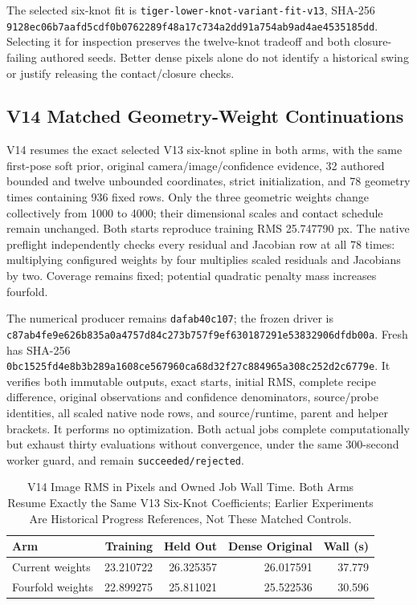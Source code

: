 \documentclass[11pt,letterpaper]{article}
\newcommand{\code}[1]{\nolinkurl{#1}}
\newcommand{\hash}[1]{{\footnotesize\nolinkurl{#1}}}
\begin{document}
The selected six-knot fit is \code{tiger-lower-knot-variant-fit-v13}, SHA-256
\hash{9128ec06b7aafd5cdf0b0762289f48a17c734a2dd91a754ab9ad4ae4535185dd}.
Selecting it for inspection preserves the twelve-knot tradeoff and both
closure-failing authored seeds. Better dense pixels alone do not identify
a historical swing or justify releasing the contact/closure checks.

\subsection{V14 Matched Geometry-Weight Continuations}
V14 resumes the exact selected V13 six-knot spline in both arms, with the
same first-pose soft prior, original camera/image/confidence evidence,
32 authored bounded and twelve unbounded coordinates, strict initialization,
and 78 geometry times containing 936 fixed rows. Only the three geometric
weights change collectively from 1000 to 4000; their dimensional scales and
contact schedule remain unchanged. Both starts reproduce training RMS
25.747790 px. The native preflight independently checks every residual and
Jacobian row at all 78 times: multiplying configured weights by four
multiplies scaled residuals and Jacobians by two. Coverage remains fixed;
potential quadratic penalty mass increases fourfold.

The numerical producer remains \code{dafab40c107}; the frozen driver is
\hash{c87ab4fe9e626b835a0a4757d84c273b757f9ef630187291e53832906dfdb00a}.
Fresh  has SHA-256
\hash{0bc1525fd4e8b3b289a1608ce567960ca68d32f27c884965a308c252d2c6779e}.
It verifies both immutable outputs, exact starts, initial RMS, complete
recipe difference, original observations and confidence denominators,
source/probe identities, all scaled native node rows, and source/runtime,
parent and helper brackets. It performs no optimization. Both actual jobs
complete computationally but exhaust thirty evaluations without convergence,
under the same 300-second worker guard, and remain \code{succeeded/rejected}.

\begin{table}[ht]\centering\small
\begin{tabular}{@{}lrrrr@{}}
\toprule Arm & Training & Held Out & Dense Original & Wall (s)\\\midrule
Current weights & 23.210722 & 26.325357 & 26.017591 & 37.779\\
Fourfold weights & 22.899275 & 25.811021 & 25.522536 & 30.596\\
\bottomrule
\end{tabular}
\caption{V14 Image RMS in Pixels and Owned Job Wall Time. Both Arms Resume
Exactly the Same V13 Six-Knot Coefficients; Earlier Experiments Are Historical
Progress References, Not These Matched Controls.}
\end{table}
\end{document}
